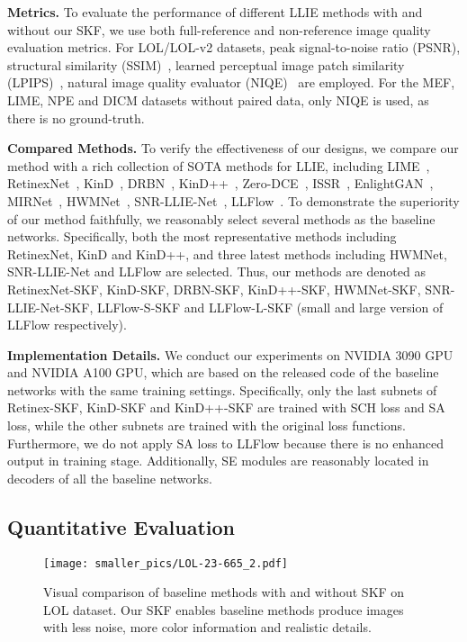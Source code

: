 \documentclass[10pt,twocolumn,letterpaper]{article}
\begin{document}
\textbf{Metrics.} To evaluate the performance of different LLIE methods with and without our SKF, we use both full-reference and non-reference image quality evaluation metrics. For LOL/LOL-v2 datasets, peak signal-to-noise ratio (PSNR), structural similarity (SSIM)~\cite{wang2004ssim}, learned perceptual image patch similarity (LPIPS)~\cite{zhang2018lpips}, natural image quality evaluator (NIQE)~\cite{mittal2012niqe} are employed. For the MEF, LIME, NPE and DICM datasets without paired data, only NIQE is used, as there is no ground-truth.

\vspace{-0.01cm}
\textbf{Compared Methods.} To verify the effectiveness of our designs, we compare our method with a rich collection of SOTA methods for LLIE, including LIME~\cite{guo2016lime}, RetinexNet~\cite{Chen2018Retinex}, KinD~\cite{zhang2019kind}, DRBN~\cite{yang2020drbn}, KinD++~\cite{zhang2021kindplus}, Zero-DCE~\cite{guo2020zerodce}, ISSR~\cite{fan2020integrating}, EnlightGAN~\cite{jiang2021enlightengan}, MIRNet~\cite{zamir2022mirnetv2}, HWMNet~\cite{fan2022hwmnet}, SNR-LLIE-Net~\cite{xu2022snr}, LLFlow~\cite{wang2022llflow}. To demonstrate the superiority of our method faithfully, we reasonably select several methods as the baseline networks. Specifically, both the most representative methods including RetinexNet, KinD and KinD++, and three latest methods including HWMNet, SNR-LLIE-Net and LLFlow are selected. Thus, our methods are denoted as RetinexNet-SKF, KinD-SKF, DRBN-SKF, KinD++-SKF, HWMNet-SKF, SNR-LLIE-Net-SKF, LLFlow-S-SKF and LLFlow-L-SKF (small and large version of LLFlow respectively). 

\vspace{-0.01cm}
\textbf{Implementation Details.} We conduct our experiments on NVIDIA 3090 GPU and NVIDIA A100 GPU, which are based on the released code of the baseline networks with the same training settings. Specifically, only the last subnets of Retinex-SKF, KinD-SKF and KinD++-SKF are trained with SCH loss and SA loss, while the other subnets are trained with the original loss functions. Furthermore, we do not apply SA loss to LLFlow because there is no enhanced output in training stage. Additionally, SE modules are reasonably located in decoders of all the baseline networks.

\vspace{-0.17cm}
\subsection{Quantitative Evaluation}
\begin{figure*}[t]
  \centering
   \texttt{[image: smaller\_pics/LOL-23-665\_2.pdf]}
   \setlength{\abovecaptionskip}{-0.4cm}
   \setlength{\belowcaptionskip}{-0.3cm}
   \caption{Visual comparison of baseline methods with and without SKF on LOL dataset. Our SKF enables baseline methods produce images with less noise, more color information and realistic details.}
   \label{fig:LOL_vis}
\end{figure*}
\end{document}
